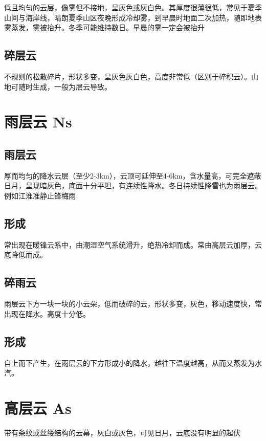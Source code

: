 \documentclass[UTF8,11pt]{ctexbook}
\begin{document}
低且均匀的云层，像雾但不接地，呈灰色或灰白色。其厚度很薄很低，常见于夏季山间与海岸线，晴朗夏季山区夜晚形成冷却雾，到早晨时地面二次加热，随即地表雾蒸发，雾被抬升。冬季可能维持数日。早晨的雾一定会被抬升

\subsection{碎层云}

不规则的松散碎片，形状多变，呈灰色灰白色，高度非常低（区别于碎积云）。山地可随时生成，一般为层云导致。

\section{雨层云 Ns}

\subsection{雨层云}

厚而均匀的降水云层（至少2-3km），云顶可延伸至4-6km，含水量高，可完全遮蔽日月，呈现暗灰色，底面十分平坦，有连续性降水。冬日持续性降雪也为雨层云。例如江淮准静止锋梅雨

\subsection{形成}

常出现在暖锋云系中，由潮湿空气系统滑升，绝热冷却而成。常由高层云加厚，云底降低而成。

\subsection{碎雨云}

雨层云下方一块一块的小云朵，低而破碎的云，形状多变，灰色，移动速度快，常出现在降水。高度十分低。

\subsection{形成}

自上而下产生，在雨层云的下方形成小的降水，越往下温度越高，从而又蒸发为水汽。

\section{高层云 As}

带有条纹或丝缕结构的云幕，灰白或灰色，可见日月，云底没有明显的起伏
\end{document}
